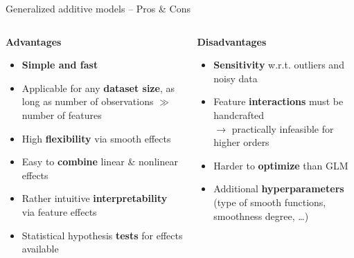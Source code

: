 \documentclass[11pt,compress,t,notes=noshow, xcolor=table]{beamer}
\newcommand{\highlight}[1]{\textcolor{hlcol}{\textbf{#1}}}
\newcommand{\positem}{\item[\textcolor{hlcol}{$\bm{+}$}]}
\newcommand{\negitem}{\item[\textcolor{hlcol}{$\bm{-}$}]}
\begin{document}
\begin{frame2}{Generalized additive models -- Pros \& Cons}

\begin{columns}[onlytextwidth]
  \begin{column}{0.5\textwidth}
    \highlight{Advantages}

    \begin{itemize}
      \positem \textbf{Simple and fast}
      \positem Applicable for any \textbf{dataset size}, as long as number of
      observations $\gg$ number of features
      \positem High \textbf{flexibility} via smooth effects
      \positem Easy to \textbf{combine} linear \& nonlinear effects
      \positem Rather intuitive \textbf{interpretability} via feature effects
      \positem Statistical hypothesis \textbf{tests} for effects available
    \end{itemize}
  \end{column}

  \begin{column}{0.5\textwidth}
    \highlight{Disadvantages}

    \begin{itemize}
      \negitem \textbf{Sensitivity} w.r.t. outliers and noisy data
      \negitem Feature \textbf{interactions} must be handcrafted\\
      $\rightarrow$ practically infeasible for higher orders
      \negitem Harder to \textbf{optimize} than GLM
      \negitem Additional \textbf{hyperparameters} (type of smooth functions,
      smoothness degree, \dots)
    \end{itemize}
  \end{column}
\end{columns}
  
\end{frame2}
\end{document}
